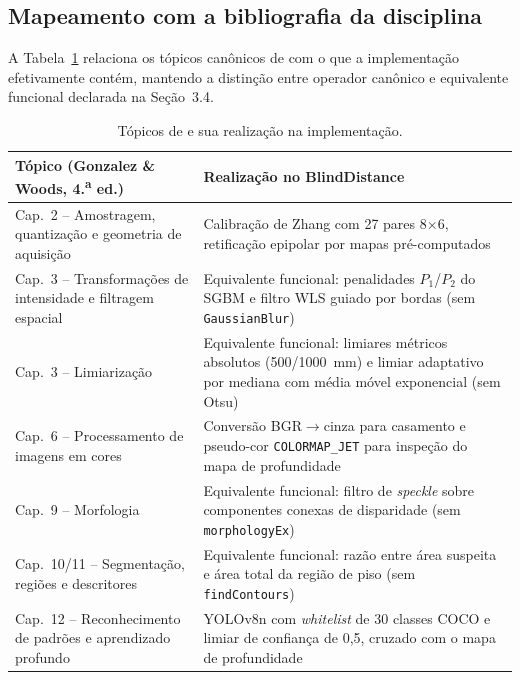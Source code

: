 \documentclass[12pt]{article}
\begin{document}
\subsection{Mapeamento com a bibliografia da disciplina}

A Tabela~\ref{quadro3} relaciona os tópicos canônicos de \cite{gonzalez2018} com o que a
implementação efetivamente contém, mantendo a distinção entre operador
canônico e equivalente funcional declarada na Seção~3.4.

\begin{table}[ht]
\centering
\caption{Tópicos de \cite{gonzalez2018} e sua realização na implementação.}
\label{quadro3}
\footnotesize
\begin{tabular}{p{5.4cm}p{7.1cm}}
\toprule
\textbf{Tópico (Gonzalez \& Woods, 4.\textsuperscript{a} ed.)} & \textbf{Realização no BlindDistance} \\
\midrule
Cap.~2 -- Amostragem, quantização e geometria de aquisição &
Calibração de Zhang com 27 pares 8$\times$6, retificação epipolar por mapas
pré-computados \\
\addlinespace
Cap.~3 -- Transformações de intensidade e filtragem espacial &
Equivalente funcional: penalidades $P_1$/$P_2$ do SGBM e filtro WLS guiado por
bordas (sem \texttt{GaussianBlur}) \\
\addlinespace
Cap.~3 -- Limiarização &
Equivalente funcional: limiares métricos absolutos (500/1000~mm) e limiar
adaptativo por mediana com média móvel exponencial (sem Otsu) \\
\addlinespace
Cap.~6 -- Processamento de imagens em cores &
Conversão BGR$\rightarrow$cinza para casamento e pseudo-cor
\texttt{COLORMAP\_JET} para inspeção do mapa de profundidade \\
\addlinespace
Cap.~9 -- Morfologia &
Equivalente funcional: filtro de \textit{speckle} sobre componentes conexas de
disparidade (sem \texttt{morphologyEx}) \\
\addlinespace
Cap.~10/11 -- Segmentação, regiões e descritores &
Equivalente funcional: razão entre área suspeita e área total da região de
piso (sem \texttt{findContours}) \\
\addlinespace
Cap.~12 -- Reconhecimento de padrões e aprendizado profundo &
YOLOv8n com \textit{whitelist} de 30 classes COCO e limiar de confiança de
0,5, cruzado com o mapa de profundidade \\
\bottomrule
\end{tabular}
\end{table}
\end{document}
